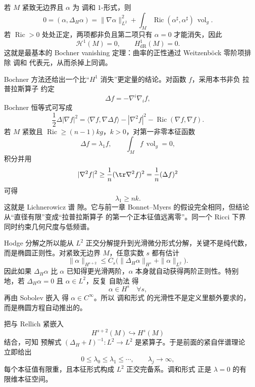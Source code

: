 若 $M$ 紧致无边界且 $\alpha$ 为 调和 $1$-形式，则
\[
0=(\alpha,\Delta_H\alpha)
=\|\nabla\alpha\|_{L^2}^2
+\int_M\operatorname{Ric}(\alpha^\sharp,\alpha^\sharp)\,\operatorname{vol}_g.
\]
若 $\operatorname{Ric}>0$ 处处正定，两项都非负且第二项只有 $\alpha=0$ 才能消失，因此
\[
\mathcal H^1(M)=0,
\qquad
H^1_{\mathrm{dR}}(M)=0.
\]
这就是最基本的 Bochner vanishing 定理：曲率的正性通过 Weitzenböck 零阶项排除 调和 代表元，从而杀掉上同调。

Bochner 方法还给出一个比“$H^1$ 消失”更定量的结论。对函数 $f$，采用本书非负 拉普拉斯算子 约定
\[
\Delta f=-\nabla^i\nabla_i f,
\]
Bochner 恒等式可写成
\begin{equation}
\frac12\Delta|\nabla f|^2
=\langle\nabla f,\nabla\Delta f\rangle
-|\nabla^2f|^2
-\operatorname{Ric}(\nabla f,\nabla f).
\label{eq:math-dg-bochner-function}
\end{equation}
若 $M$ 紧致且 $\operatorname{Ric}\ge(n-1)k g$，$k>0$，对第一非零本征函数
\[
\Delta f=\lambda_1 f,
\qquad
\int_M f\,\operatorname{vol}_g=0,
\]
积分并用
\[
|\nabla^2 f|^2\ge\frac1n(\tr\nabla^2f)^2
=\frac1n(\Delta f)^2
\]
可得
\begin{equation}
\boxed{\lambda_1\ge nk.}
\label{eq:math-dg-lichnerowicz-gap}
\end{equation}
这就是 Lichnerowicz 谱 隙。它与前一章 Bonnet--Myers 的假设完全相同，但结论从“直径有限”变成“拉普拉斯算子 的第一个正本征值远离零”。同一个 Ricci 下界同时约束几何尺度与低频谱。

Hodge 分解之所以能从 $L^2$ 正交分解提升到光滑微分形式分解，关键不是纯代数，而是椭圆正则性。对紧致无边界 $M$，任意实数 $s$ 都有估计
\begin{equation}
\boxed{
\|\alpha\|_{H^{s+2}}
\le C_s\bigl(
\|\Delta_H\alpha\|_{H^s}
+\|\alpha\|_{L^2}
\bigr)
}.
\label{eq:math-dg-hodge-elliptic-estimate}
\end{equation}
因此如果 $\Delta_H\alpha$ 比 $\alpha$ 已知得更光滑两阶，$\alpha$ 本身就自动获得两阶正则性。特别地，若 $\Delta_H\alpha=0$ 且 $\alpha\in L^2$，反复 自助法 得
\[
\alpha\in H^s\quad\forall s,
\]
再由 Sobolev 嵌入 得 $\alpha\in C^\infty$。所以 调和形式 的光滑性不是定义里额外要求的，而是椭圆方程自动推出的。

把与 Rellich 紧嵌入
\[
H^{s+2}(M)\hookrightarrow H^s(M)
\]
结合，可知 预解式 $(\Delta_H+I)^{-1}:L^2\to L^2$ 是紧算子。于是前面的紧自伴谱理论立即给出
\[
0\le\lambda_0\le\lambda_1\le\cdots,
\qquad
\lambda_j\to\infty,
\]
每个本征值有限重，且本征形式构成 $L^2$ 正交完备系。调和形式 正是 $\lambda=0$ 的有限维本征空间。

